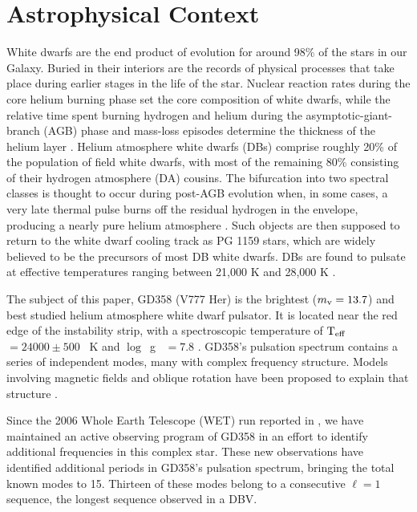 \documentclass[12pt,preprint]{aastex}
\newcommand{\teff}{$\rm T_{eff}$}
\newcommand{\logg}{$\log$\ g }
\begin{document}

\section{Astrophysical Context}
\label{intro}
White dwarfs are the end product of evolution for around 98\% of the stars in our Galaxy. 
Buried in their interiors are the records of physical processes that take place during 
earlier stages in the life of the star. Nuclear reaction rates during the core helium 
burning phase set the core composition of white dwarfs, while the relative time spent 
burning hydrogen and helium during the asymptotic-giant-branch (AGB) phase and mass-loss 
episodes determine the thickness of the helium layer \citep{Lawlor06,Althaus05}. Helium 
atmosphere white dwarfs (DBs) comprise roughly 20\% of the population of field white 
dwarfs, with most of the remaining 80\% consisting of their hydrogen atmosphere (DA) 
cousins. The bifurcation into two spectral classes is thought to occur during post-AGB 
evolution when, in some cases, a very late thermal pulse burns off the residual hydrogen 
in the envelope, producing a nearly pure helium atmosphere \citep{Iben83}. Such objects 
are then supposed to return to the white dwarf cooling track as PG 1159 stars, which are 
widely believed to be the precursors of most DB white dwarfs. DBs are found to pulsate at 
effective temperatures ranging between 21,000 K and 28,000 K \citep{Beauchamp99, Castanheira05}. 

The subject of this paper, GD358 (V777 Her) is the brightest ($m_{\rm v}=13.7$) and best 
studied helium atmosphere white dwarf pulsator. It is located near the red edge of the 
instability strip, with a spectroscopic temperature of \teff\ $=24000\pm500$ ~K and \logg\ $=7.8$ 
\citep{Koester2013}. GD358's pulsation spectrum contains a series of independent 
modes, many with complex frequency structure.  Models involving magnetic fields and oblique rotation 
have been proposed to explain that structure \citep{Montgomery10}.

Since the 2006 Whole Earth Telescope (WET) run reported in \citet{Provencal09}, 
we have maintained an active observing program of GD358 in an effort to identify additional
frequencies in this complex star. These new observations have identified additional 
periods in GD358's pulsation spectrum, bringing the total known modes to 15. Thirteen of 
these modes belong to a consecutive $\ell=1$ sequence, the longest sequence observed 
in a DBV. 
\end{document}
